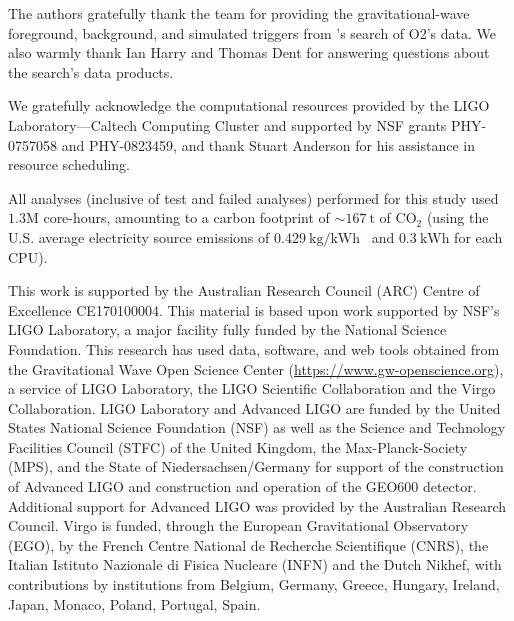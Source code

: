 \documentclass[
 nofootinbib,
 amsmath,amssymb,
 aps,
 twocolumn,
 superscriptaddress
]{revtex4-2}
\newcommand{\pycbc}{{\sc {{PyCBC}}}\xspace}
\begin{document}
\begin{acknowledgments}
The authors gratefully thank the \pycbc team for providing the gravitational-wave foreground, background, and simulated triggers from \pycbc's search of O2's data. We also warmly thank Ian Harry and Thomas Dent for answering questions about the \pycbc search's data products.  

We gratefully acknowledge the computational resources provided by the LIGO Laboratory—Caltech Computing Cluster and supported by NSF grants PHY-0757058 and PHY-0823459, and thank Stuart Anderson for his assistance in resource scheduling.

All analyses (inclusive of test and failed analyses) performed for this study used ${1.3\mathrm{M}}$ core-hours, amounting to a carbon footprint of ${\sim167\ \mathrm{t}}$ of ${\text{CO}_2}$ (using the U.S. average electricity source emissions of ${0.429\ \text{kg/kWh}}$~\cite{greenhouse} and ${0.3\ \text{kWh}}$ for each CPU).

This work is supported by the Australian Research Council (ARC) Centre of Excellence CE170100004. This material is based upon work supported by NSF’s LIGO Laboratory, a major facility fully funded by the National Science Foundation. This research has used data, software, and web tools obtained from the Gravitational Wave Open Science Center (\href{https://www.gw-openscience.org}{https://www.gw-openscience.org}), a service of LIGO Laboratory, the LIGO Scientific Collaboration and the Virgo Collaboration. LIGO Laboratory and Advanced LIGO are funded by the United States National Science Foundation (NSF) as well as the Science and Technology Facilities Council (STFC) of the United Kingdom, the Max-Planck-Society (MPS), and the State of Niedersachsen/Germany for support of the construction of Advanced LIGO and construction and operation of the GEO600 detector. Additional support for Advanced LIGO was provided by the Australian Research Council. Virgo is funded, through the European Gravitational Observatory (EGO), by the French Centre National de Recherche Scientifique (CNRS), the Italian Istituto Nazionale di Fisica Nucleare (INFN) and the Dutch Nikhef, with contributions by institutions from Belgium, Germany, Greece, Hungary, Ireland, Japan, Monaco, Poland, Portugal, Spain.\\



\end{acknowledgments}
\end{document}

